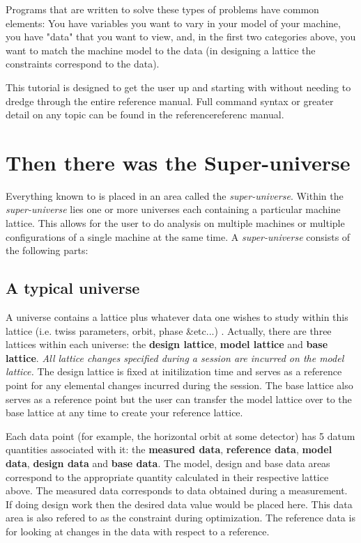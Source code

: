 \documentclass{report}
\begin{document}
Programs that are written to solve these types of problems have common
elements: You have variables you want to vary in your model of your
machine, you have "data" that you want to view, and, in the first two
categories above, you want to match the machine model to the data (in
designing a lattice the constraints correspond to the data).

This tutorial is designed to get the user up and starting with \tao without
needing to dredge through the entire reference manual. Full command syntax
or greater detail on any topic can be found in the referencereferenc  manual.

\section{Then there was the Super-universe}

Everything known to \tao is placed in an area called the
\textit{super-universe}. Within the \textit{super-universe} lies one or more
universes each containing a particular machine lattice. This allows for the user
to do analysis on multiple machines or multiple configurations of a single
machine at the same time. A \textit{super-universe} consists of the following
parts:

\subsection{A typical universe}
A universe contains a \bmad lattice plus whatever data one wishes to study
within this lattice (i.e. twiss parameters, orbit, phase \&etc...) . Actually,
there are three lattices within each universe: the \textbf{design
lattice}, \textbf{model lattice} and \textbf{base lattice}. \emph{All lattice changes
specified during a \tao session are incurred on the model lattice.} The design lattice is
fixed at initilization time and serves as a reference point for any elemental
changes incurred during the \tao session. The base lattice also serves as a
reference point but the user can transfer the model lattice over to the base
lattice at any time to create your reference lattice.

Each data point (for example, the horizontal orbit at some detector) has 5 datum
 quantities associated with it: the \textbf{measured data}, \textbf{reference
data}, \textbf{model data}, \textbf{design data} and \textbf{base data}. The
model, design and base data areas correspond to the appropriate quantity
calculated in their respective lattice above. The measured data corresponds to 
data obtained during a measurement. If doing design work then the desired data
value would be placed here. This data area is also refered to as the constraint during
optimization. The reference data is for looking at changes in the data with
respect to a reference.
\end{document}
